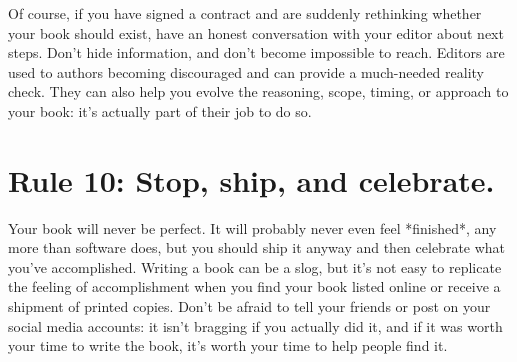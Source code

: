 \documentclass[10pt,letterpaper]{article}
\begin{document}
Of course,
if you have signed a contract and are suddenly rethinking whether your book should exist,
have an honest conversation with your editor about next steps.
Don't hide information,
and don't become impossible to reach.
Editors are used to authors becoming discouraged
and can provide a much-needed reality check.
They can also help you evolve the reasoning, scope, timing, or approach to your book:
it's actually part of their job to do so.

\section*{Rule 10: Stop, ship, and celebrate.}

Your book will never be perfect.
It will probably never even feel *finished*,
any more than software does,
but you should ship it anyway
and then celebrate what you've accomplished.
Writing a book can be a slog,
but it's not easy to replicate the feeling of accomplishment
when you find your book listed online or receive a shipment of printed copies.
Don't be afraid to tell your friends or post on your social media accounts:
it isn't bragging if you actually did it,
and if it was worth your time to write the book,
it's worth your time to help people find it.



\end{document}
